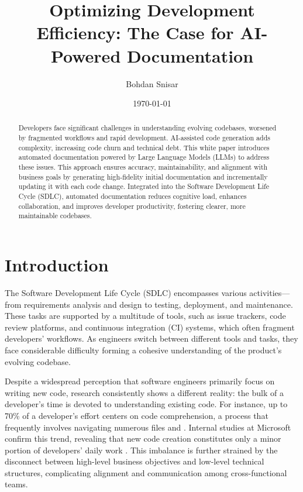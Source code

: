 \documentclass[12pt,oneside]{article}
\date{\small\today}
\title{%
  Optimizing Development Efficiency: The Case for AI-Powered Documentation \\
  \colorbox{mypink}{\small\sffamily\color{white}{White Paper}}}
\author{Bohdan Snisar}
\begin{document}
\raggedbottom
\maketitle

\begin{abstract}
Developers face significant challenges in understanding evolving codebases, worsened by fragmented workflows and rapid development. AI-assisted code generation adds complexity, increasing code churn and technical debt. This white paper introduces automated documentation powered by Large Language Models (LLMs) to address these issues. This approach ensures accuracy, maintainability, and alignment with business goals by generating high-fidelity initial documentation and incrementally updating it with each code change. Integrated into the Software Development Life Cycle (SDLC), automated documentation reduces cognitive load, enhances collaboration, and improves developer productivity, fostering clearer, more maintainable codebases.
\end{abstract}

\section{Introduction}

The Software Development Life Cycle (SDLC) encompasses various activities— from requirements analysis and design to 
testing, deployment, and maintenance. These tasks are supported by a multitude of tools, such as issue trackers, code 
review platforms, and continuous integration (CI) systems, which often fragment developers’ workflows. As engineers 
switch between different tools and tasks, they face considerable difficulty forming a cohesive understanding of the 
product’s evolving codebase.

Despite a widespread perception that software engineers primarily focus on writing new code, research consistently 
shows a different reality: the bulk of a developer’s time is devoted to understanding existing code. For instance, 
up to 70\% of a developer’s effort centers on code comprehension, a process that frequently involves navigating 
numerous files \textcite{ko2006exploratory} and \textcite{Schroer_2024}. Internal studies at Microsoft confirm this 
trend, revealing that new code creation constitutes only a minor portion of developers’ daily work 
\textcite{meyer2021today}. This imbalance is further strained by the disconnect between high-level business objectives 
and low-level technical structures, complicating alignment and communication among cross-functional teams.
\end{document}
